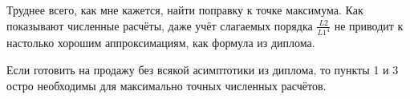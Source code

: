 \documentclass[a4paper, 12pt]{article}
\begin{document}
Труднее всего, как мне кажется, найти поправку к точке максимума. Как показывают численные расчёты, даже учёт слагаемых порядка $\frac{L2}{L1^4}$ не приводит к настолько хорошим аппроксимациям, как формула из диплома.

Если готовить на продажу без всякой асимптотики из диплома, то пункты 1 и 3 остро необходимы для максимально точных численных расчётов.
\end{document}
